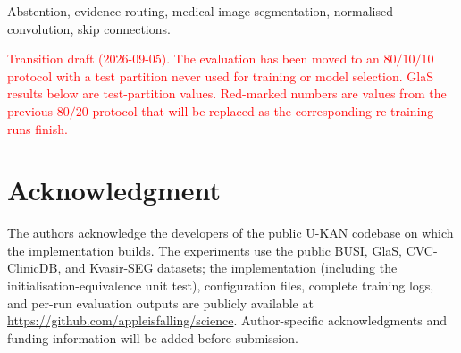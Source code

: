 \documentclass[journal,twoside,web]{ieeecolor}
\newcommand{\TODO}[1]{\textcolor{red}{[TODO: #1]}}
\begin{document}
\begin{IEEEkeywords}
Abstention, evidence routing, medical image segmentation, normalised convolution, skip connections.
\end{IEEEkeywords}

\noindent\textcolor{red}{Transition draft (2026-09-05). The evaluation has been moved to an $80/10/10$ protocol with a test partition never used for training or model selection. GlaS results below are test-partition values. Red-marked numbers are values from the previous $80/20$ protocol that will be replaced as the corresponding re-training runs finish.}








\section*{Acknowledgment}
The authors acknowledge the developers of the public U-KAN codebase on which the implementation builds. The experiments use the public BUSI, GlaS, CVC-ClinicDB, and Kvasir-SEG datasets; the implementation (including the initialisation-equivalence unit test), configuration files, complete training logs, and per-run evaluation outputs are publicly available at \url{https://github.com/appleisfalling/science}. Author-specific acknowledgments and funding information will be added before submission.


\def\IEEEbibitemsep{0pt plus .5pt}

\end{document}

